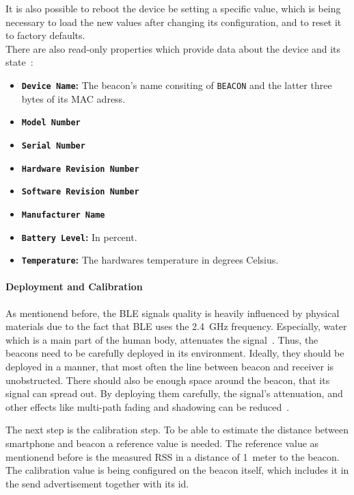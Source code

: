 It is also possible to reboot the device be setting a specific value, which is being necessary to load the new values after changing its configuration, and to reset it to factory defaults.\\
\newline
There are also read-only properties which provide data about the device and its state~\cite{binside:ds}:
\begin{itemize}
  \item \textbf{\texttt{Device Name}:} The beacon's name consiting of \texttt{BEACON} and the latter three bytes of its \acs{MAC} adress.
  \item \textbf{\texttt{Model Number}}
  \item \textbf{\texttt{Serial Number}}
  \item \textbf{\texttt{Hardware Revision Number}}
  \item \textbf{\texttt{Software Revision Number}}
  \item \textbf{\texttt{Manufacturer Name}}
  \item \textbf{\texttt{Battery Level}:} In percent.
  \item \textbf{\texttt{Temperature}:} The hardwares temperature in degrees Celsius.
\end{itemize}

\paragraph{Deployment and Calibration}
As mentionend before, the \acs{BLE} signals quality is heavily influenced by physical materials due to the fact that \acs{BLE} uses the 2.4~GHz frequency.
Especially, water which is a main part of the human body, attenuates the signal~\cite{apple:getting_started}.
Thus, the beacons need to be carefully deployed in its environment.
Ideally, they should be deployed in a manner, that most often the line between beacon and receiver is unobstructed.
There should also be enough space around the beacon, that its signal can spread out.
By deploying them carefully, the signal's attenuation, and other effects like multi-path fading and shadowing can be reduced~\cite{apple:getting_started, IEEE:survey_wireless_indoor_pos}.

The next step is the calibration step. To be able to estimate the distance between smartphone and beacon a reference value is needed. The reference value as mentionend before is the measured \acs{RSS} in a distance of 1~meter to the beacon. The calibration value is being configured on the beacon itself, which includes it in the send advertisement together with its id.

